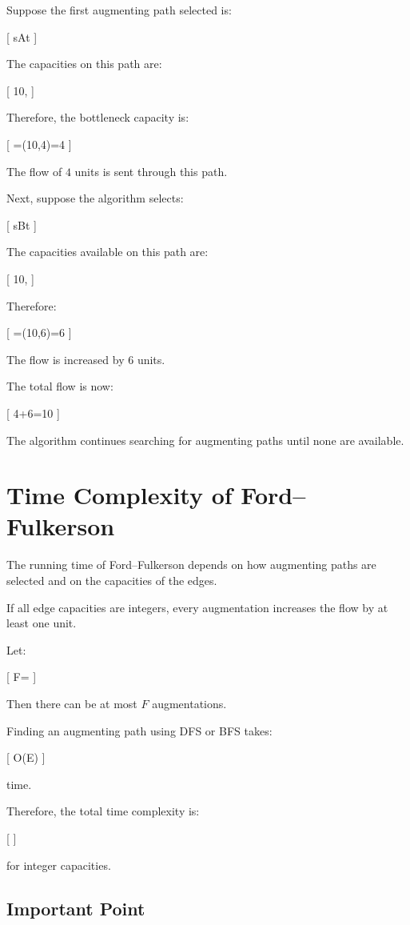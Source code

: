 \documentclass[12pt,a4paper]{article}
\begin{document}
Suppose the first augmenting path selected is:

[
s\rightarrow A\rightarrow t
]

The capacities on this path are:

[
10,
]

Therefore, the bottleneck capacity is:

[
\Delta=\min(10,4)=4
]

The flow of $4$ units is sent through this path.

Next, suppose the algorithm selects:

[
s\rightarrow B\rightarrow t
]

The capacities available on this path are:

[
10,
]

Therefore:

[
\Delta=\min(10,6)=6
]

The flow is increased by $6$ units.

The total flow is now:

[
4+6=10
]

The algorithm continues searching for augmenting paths until none are
available.

\section{Time Complexity of Ford--Fulkerson}

The running time of Ford--Fulkerson depends on how augmenting paths are
selected and on the capacities of the edges.

If all edge capacities are integers, every augmentation increases the
flow by at least one unit.

Let:

[
F=
]

Then there can be at most $F$ augmentations.

Finding an augmenting path using DFS or BFS takes:

[
O(E)
]

time.

Therefore, the total time complexity is:

[
]

for integer capacities.

\subsection{Important Point}
\end{document}
